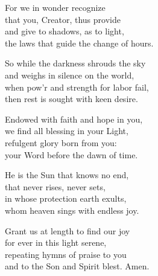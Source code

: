 
For we in wonder recognize\\
that you, Creator, thus provide\\
and give to shadows, as to light,\\
the laws that guide the change of hours.

So while the darkness shrouds the sky\\
and weighs in silence on the world,\\
when pow’r and strength for labor fail,\\
then rest is sought with keen desire.

Endowed with faith and hope in you,\\
we find all blessing in your Light,\\
refulgent glory born from you:\\
your Word before the dawn of time.

He is the Sun that knows no end,\\
that never rises, never sets,\\
in whose protection earth exults,\\
whom heaven sings with endless joy.

Grant us at length to find our joy\\
for ever in this light serene,\\
repeating hymns of praise to you\\
and to the Son and Spirit blest. Amen.